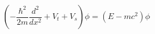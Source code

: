 \begin{equation}
\left( -\frac{\hbar ^{2}}{2m}\frac{d^{2}}{dx^{2}}+V_{t}+V_{s}\right) \phi
=\left( E-mc^{2}\right) \phi  \label{eq8d}
\end{equation}

